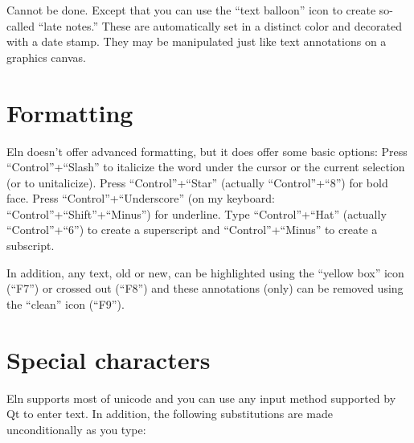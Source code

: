 \documentclass[11pt]{report}
\begin{document}
Cannot be done. Except that you can use the ``text balloon'' icon to
create so-called ``late notes.'' These are automatically set in a
distinct color and decorated with a date stamp. They
may be manipulated just like text annotations on a graphics canvas.

\section{Formatting}

Eln doesn't offer advanced formatting, but it does offer some basic
options: Press ``Control''+``Slash'' to italicize the word under the
cursor or the current selection (or to unitalicize). Press
``Control''+``Star'' (actually ``Control''+``8'') for bold face. Press
``Control''+``Underscore'' (on my keyboard: ``Control''+``Shift''+``Minus'') for
underline. Type ``Control''+``Hat'' (actually ``Control''+``6'') to create a superscript
and ``Control''+``Minus'' to create a subscript.

In addition, any text, old or new, can be highlighted using the
``yellow box'' icon (``F7'') or crossed out (``F8'') and these
annotations (only) can be removed using the ``clean'' icon (``F9'').

\section{Special characters}

Eln supports most of unicode and you can use any input method
supported by Qt to enter text. In addition, the following
substitutions are made unconditionally as you type:\medskip
\end{document}
